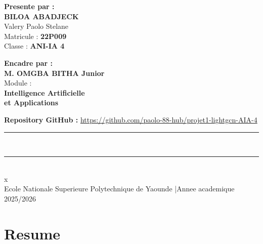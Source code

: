 \documentclass[12pt,a4paper]{report}
\begin{document}
\begin{titlepage}
\begin{center}
\begin{minipage}[t]{0.46\textwidth}
\raggedright
\begin{tcolorbox}[colback=lightblue,colframe=enspyblue,arc=6pt,boxrule=1.5pt]
  {\small\bfseries\color{enspyblue} Presente par :}\\[5pt]
  {\normalsize\bfseries BILOA ABADJECK}\\
  {\normalsize Valery Paolo Stelane}\\[3pt]
  {\small\color{darkgray} Matricule : \textbf{22P009}}\\
  {\small\color{darkgray} Classe : \textbf{ANI-IA 4}}
\end{tcolorbox}
\end{minipage}
\hfill
\begin{minipage}[t]{0.46\textwidth}
\raggedleft
\begin{tcolorbox}[colback=enspyorange!10,colframe=enspyorange,arc=6pt,boxrule=1.5pt]
  {\small\bfseries\color{enspyorange} Encadre par :}\\[5pt]
  {\normalsize\bfseries M. OMGBA BITHA Junior}\\[3pt]
  {\small\color{darkgray} Module :}\\
  {\small\bfseries Intelligence Artificielle}\\
  {\small\bfseries et Applications}
\end{tcolorbox}
\end{minipage}

\vspace{0.6cm}

{\small\color{darkgray}
  \textbf{Repository GitHub :}
  \url{https://github.com/paolo-88-hub/projet1-lightgcn-AIA-4}}

\vfill

\noindent\textcolor{enspyorange}{\rule{\textwidth}{0.18cm}}\\[-2pt]
\noindent\textcolor{enspyblue}{\rule{\textwidth}{0.45cm}}\\[4pt]
{\color{white}x}\\[-14pt]
{\color{darkgray}\normalsize
  Ecole Nationale Superieure Polytechnique de Yaounde
  \quad|\quad Annee academique 2025/2026}

\end{center}
\end{titlepage}

\chapter*{Resume}
\thispagestyle{fancy}
\end{document}
